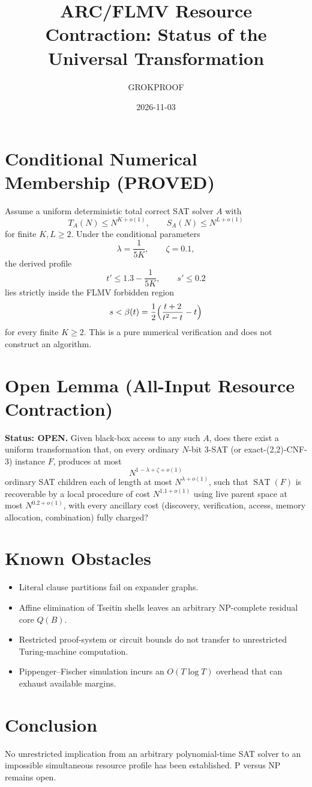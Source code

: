 \documentclass{article}
\title{ARC/FLMV Resource Contraction: Status of the Universal Transformation}
\author{GROKPROOF}
\date{2026-11-03}
\begin{document}
\maketitle

\section{Conditional Numerical Membership (PROVED)}
Assume a uniform deterministic total correct SAT solver \(A\) with
\[
T_A(N) \le N^{K+o(1)}, \qquad S_A(N) \le N^{L+o(1)}
\]
for finite \(K,L \ge 2\). Under the conditional parameters
\[
\lambda = \frac1{5K}, \qquad \zeta = 0.1,
\]
the derived profile
\[
t' \le 1.3 - \frac1{5K}, \qquad s' \le 0.2
\]
lies strictly inside the FLMV forbidden region
\[
s < \beta(t) = \frac12 \Bigl( \frac{t+2}{t^2 - t} - t \Bigr)
\]
for every finite \(K \ge 2\). This is a pure numerical verification and does not construct an algorithm.

\section{Open Lemma (All-Input Resource Contraction)}
\textbf{Status: OPEN.}
Given black-box access to any such \(A\), does there exist a uniform transformation that, on every ordinary \(N\)-bit 3-SAT (or exact-(2,2)-CNF-3) instance \(F\), produces at most
\[
N^{1-\lambda+\zeta+o(1)}
\]
ordinary SAT children each of length at most \(N^{\lambda+o(1)}\), such that \(\operatorname{SAT}(F)\) is recoverable by a local procedure of cost \(N^{1.1+o(1)}\) using live parent space at most \(N^{0.2+o(1)}\), with every ancillary cost (discovery, verification, access, memory allocation, combination) fully charged?

\section{Known Obstacles}
\begin{itemize}
\item Literal clause partitions fail on expander graphs.
\item Affine elimination of Tseitin shells leaves an arbitrary NP-complete residual core \(Q(B)\).
\item Restricted proof-system or circuit bounds do not transfer to unrestricted Turing-machine computation.
\item Pippenger--Fischer simulation incurs an \(O(T\log T)\) overhead that can exhaust available margins.
\end{itemize}

\section{Conclusion}
No unrestricted implication from an arbitrary polynomial-time SAT solver to an impossible simultaneous resource profile has been established. P versus NP remains open.
\end{document}
